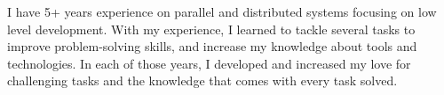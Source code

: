 

\begin{cvparagraph}

    I have 5+ years experience on parallel and distributed systems focusing on
    low level development. With my experience, I learned to tackle several tasks
    to improve problem-solving skills, and increase my knowledge about tools and
    technologies. In each of those years, I developed and increased my love for
    challenging tasks and the knowledge that comes with every task solved.

\end{cvparagraph}
